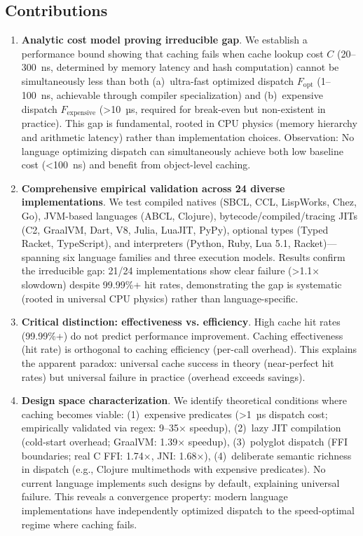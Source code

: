 \documentclass[sigplan,final,acmsmall,review,screen]{acmart}
\begin{document}
\subsection{Contributions}

\begin{enumerate}
  \item \textbf{Analytic cost model proving irreducible gap}. We establish a performance bound showing that caching fails when
    cache lookup cost $C$ (20--300~ns, determined by memory latency and hash computation) cannot be simultaneously less than both
    (a)~ultra-fast optimized dispatch $F_{\text{opt}}$ (1--100~ns, achievable through compiler specialization) and (b)~expensive dispatch
    $F_{\text{expensive}}$ (>10~µs, required for break-even but non-existent in practice). This gap is fundamental, rooted in CPU physics
    (memory hierarchy and arithmetic latency) rather than implementation choices. Observation: No language optimizing dispatch can simultaneously
    achieve both low baseline cost (<100~ns) and benefit from object-level caching.

  \item \textbf{Comprehensive empirical validation across 24 diverse implementations}. We test compiled natives (SBCL, CCL, LispWorks, Chez, Go),
    JVM-based languages (ABCL, Clojure), bytecode/compiled/tracing JITs (C2, GraalVM, Dart, V8, Julia, LuaJIT, PyPy), optional types (Typed Racket, TypeScript), and interpreters
    (Python, Ruby, Lua 5.1, Racket)—spanning six language families and three execution models. Results confirm the irreducible gap: 21/24 implementations show clear failure
    (>1.1× slowdown) despite 99.99\%+ hit rates, demonstrating the gap is systematic (rooted in universal CPU physics) rather than language-specific.

  \item \textbf{Critical distinction: effectiveness vs. efficiency}. High cache hit rates (99.99\%+) do not predict performance improvement.
    Caching effectiveness (hit rate) is orthogonal to caching efficiency (per-call overhead). This explains the apparent paradox: universal cache success
    in theory (near-perfect hit rates) but universal failure in practice (overhead exceeds savings).

  \item \textbf{Design space characterization}. We identify theoretical conditions where caching becomes viable: (1)~expensive predicates (>1~µs dispatch cost; empirically validated via regex: 9--35× speedup),
    (2)~lazy JIT compilation (cold-start overhead; GraalVM: 1.39× speedup), (3)~polyglot dispatch (FFI boundaries; real C FFI: 1.74×, JNI: 1.68×),
    (4)~deliberate semantic richness in dispatch (e.g., Clojure multimethods with expensive predicates). No current language implements such designs by default, explaining universal failure. This reveals a convergence property: modern language implementations
    have independently optimized dispatch to the speed-optimal regime where caching fails.


\end{enumerate}
\end{document}
